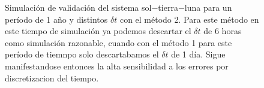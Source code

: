 \begin{figure}
{	\label{fig:ej1_m2_365_12}
	}
	\caption{
		Simulación de validación del sistema sol$-$tierra$-$luna para un período de 1 año y distintos $\delta t$
		con el método 2.
		Para este método en este tiempo de simulación ya podemos descartar el $\delta t$ de 6 horas como simulación razonable,
		cuando con el método 1 para este período de tiemnpo solo descartabamos el $\delta t$ de 1 día.
		Sigue manifestandose entonces la alta sensibilidad a los errores por discretizacion del tiempo.
	}
	\label{ fig:res_ej1_m2_365 }
\end{figure}
